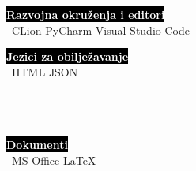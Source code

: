 \documentclass[9pt]{developercv} %
\begin{document}
\begin{minipage}[t]{0.4\textwidth}
	\vspace{-\baselineskip}
	
	\colorbox{black}{{\textcolor{white}{\textbf{Razvojna okruženja i editori}}}}\smallskip\\\
	{CLion} \hspace{10} {PyCharm} \hspace{10} {Visual Studio Code}\smallskip\\
\end{minipage}
\hfill
\begin{minipage}[t]{0.3\textwidth}
	\vspace{-\baselineskip}
	
	\colorbox{black}{{\textcolor{white}{\textbf{Jezici za obilježavanje}}}}\smallskip\\\
	{HTML} \hspace{10} {JSON}\smallskip\\\\\\\
\end{minipage}
\hfill
\begin{minipage}[t]{0.2\textwidth}
	\vspace{-\baselineskip}
	
	\colorbox{black}{{\textcolor{white}{\textbf{Dokumenti}}}}\smallskip\\\
	{MS Office} \hspace{10} {LaTeX}\\
\end{minipage}

\end{document}
